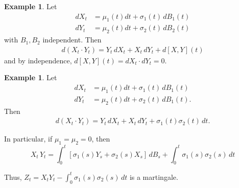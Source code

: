\documentclass[10pt, oneside, reqno]{amsart}
\theoremstyle{plain}%
\theoremstyle{definition}
\newtheorem{exmp}[thm]{Example}
\theoremstyle{remark}
\begin{document}
\begin{exmp}
    Let \begin{align*}
        dX_t &= \mu_1(t) dt + \sigma_1(t) \, dB_1(t) \\
        dY_t &= \mu_2(t) dt + \sigma_2(t) \, dB_2(t)
    \end{align*} with $B_1, B_2$ independent. Then \begin{align*}
        d(X_t \cdot Y_t) = Y_t \, dX_t + X_t \, dY_t + d[X,Y](t)
    \end{align*} and by independence, $d[X,Y](t) = dX_t \cdot dY_t = 0$.
\end{exmp}

\begin{exmp}
    Let \begin{align*}
        dX_t &= \mu_1(t) dt + \sigma_1(t) \, dB_1(t) \\
        dY_t &= \mu_2(t) dt + \sigma_2(t) \, dB_1(t).
    \end{align*} Then \begin{align*}
        d(X_t \cdot Y_t) = Y_t \, dX_t + X_t \, dY_t + \sigma_1(t) \sigma_2(t) \, dt.
    \end{align*}
    
    In particular, if $\mu_1 = \mu_2 = 0$, then \[
        X_t \, Y_t = \int_0^t [ \sigma_1(s) Y_s + \sigma_2(s) X_s] \, dB_s + \int_0^t \sigma_1(s) \sigma_2(s) \, dt
    \]  
    
    Thus, $Z_t = X_t Y_t - \int_0^t \sigma_1(s) \sigma_2(s) \, dt$ is a martingale.
\end{exmp}
\end{document}
